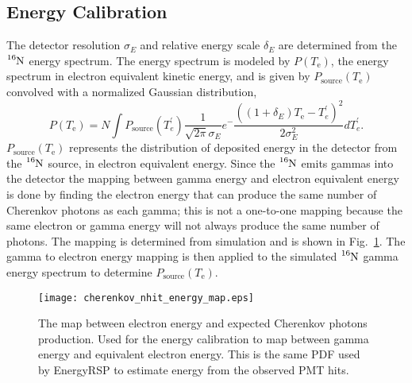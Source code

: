\subsection{Energy Calibration}
The detector resolution $\sigma_{E}$ and relative energy scale $\delta_{E}$ are determined
from the $\ce{^{16}N}$ energy spectrum.
The energy spectrum is modeled by $P(T_\mathrm{e})$, the energy spectrum in
electron equivalent kinetic energy, and is given by $P_{\mathrm{source}}(T_{\mathrm{e}})$
convolved with a normalized Gaussian distribution,
\begin{equation}
    P(T_\mathrm{e}) = N \int P_\mathrm{source}(T^{\prime}_{e})\frac{1}{\sqrt{2\pi}\sigma_{E}}e^-{\frac{\left((1+\delta_E)T_\mathrm{e}-T^{\prime}_{e}\right)^{2}}{2\sigma^{2}_{E}}}dT^{\prime}_{e}\text{.}%
\label{eq:convolution}
\end{equation}
$P_\mathrm{source}(T_{\mathrm{e}})$ represents the distribution of deposited energy in
the detector from the $\ce{^{16}N}$ source, in electron equivalent energy.
Since the $\ce{^{16}N}$ emits gammas into the detector the mapping between
gamma energy and electron equivalent energy is done by finding the electron
energy that can produce the same number of Cherenkov photons
as each gamma; this is not a one-to-one mapping because the same electron or gamma
energy will not always produce the same number of photons.
The mapping is determined from simulation and is shown in
Fig.~\ref{fig:cherenkov_energy_map}.
The gamma to electron energy mapping is then applied to the simulated $\ce{^{16}N}$
gamma energy spectrum to determine $P_\mathrm{source}(T_{\mathrm{e}})$.

\begin{figure}[htbp]
\centering
\texttt{[image: cherenkov\_nhit\_energy\_map.eps]}
\caption[Electron Cherenkov Photon Product PDF]{ The map between electron
energy and expected Cherenkov photons production.  Used for the energy
calibration to map between gamma energy and equivalent electron energy.  This is
the same PDF used by EnergyRSP to estimate energy from the observed PMT hits.}
\label{fig:cherenkov_energy_map}
\end{figure}

